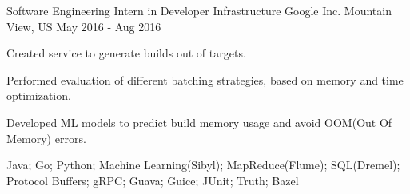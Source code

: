 

\begin{cventries}


  \cventry
    {Software Engineering Intern in Developer Infrastructure} %
    {Google Inc.} %
    {Mountain View, US} %
    {May 2016 - Aug 2016} %
    {
      \begin{cvitems} %
        \item {Created service to generate builds out of targets.}
        \item {Performed evaluation of different batching strategies, based on memory and time optimization.}
        \item {Developed ML models to predict build memory usage and avoid OOM(Out Of Memory) errors.}
        \item {Java; Go; Python; Machine Learning(Sibyl); MapReduce(Flume); SQL(Dremel); Protocol Buffers; gRPC; Guava; Guice; JUnit; Truth; Bazel}
      \end{cvitems}
    }

\end{cventries}
